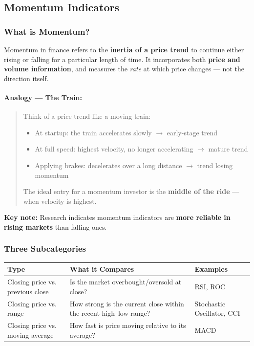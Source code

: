 \documentclass[12pt,openany]{book}
\begin{document}
\subsection{Momentum Indicators}

\subsubsection{What is Momentum?}

Momentum in finance refers to the \textbf{inertia of a price trend} to continue either rising or falling for a particular length of time. It incorporates both \textbf{price and volume information}, and measures the \emph{rate} at which price changes --- not the direction itself.

\paragraph{Analogy --- The Train:}
\begin{quote}
Think of a price trend like a moving train:
\begin{itemize}[leftmargin=*]
    \item At startup: the train accelerates slowly \(\rightarrow\) early-stage trend
    \item At full speed: highest velocity, no longer accelerating \(\rightarrow\) mature trend
    \item Applying brakes: decelerates over a long distance \(\rightarrow\) trend losing momentum
\end{itemize}

The ideal entry for a momentum investor is the \textbf{middle of the ride} --- when velocity is highest.

\end{quote}
\textbf{Key note:} Research indicates momentum indicators are \textbf{more reliable in rising markets} than falling ones.

\subsubsection{Three Subcategories}

\begin{center}
\small
\renewcommand{\arraystretch}{1.2}
\begin{tabular}{|L{0.25\textwidth}|L{0.34\textwidth}|L{0.31\textwidth}|}
\hline
 \textbf{Type} & \textbf{What it Compares} & \textbf{Examples} \\ \hline
 Closing price vs. previous close & Is the market overbought/oversold at close? & RSI, ROC \\ \hline
 Closing price vs. range & How strong is the current close within the recent high--low range? & Stochastic Oscillator, CCI \\ \hline
 Closing price vs. moving average & How fast is price moving relative to its average? & MACD \\ \hline
\end{tabular}
\end{center}
\end{document}
